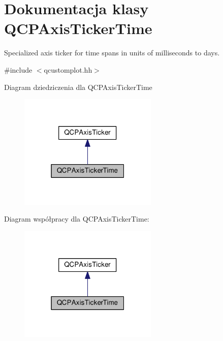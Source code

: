 \hypertarget{class_q_c_p_axis_ticker_time}{}\section{Dokumentacja klasy Q\+C\+P\+Axis\+Ticker\+Time}
\label{class_q_c_p_axis_ticker_time}


Specialized axis ticker for time spans in units of milliseconds to days.  




{\ttfamily \#include $<$qcustomplot.\+hh$>$}



Diagram dziedziczenia dla Q\+C\+P\+Axis\+Ticker\+Time\nopagebreak
\begin{figure}[H]
\begin{center}
\leavevmode
\includegraphics[width=187pt]{class_q_c_p_axis_ticker_time__inherit__graph}
\end{center}
\end{figure}


Diagram współpracy dla Q\+C\+P\+Axis\+Ticker\+Time\+:\nopagebreak
\begin{figure}[H]
\begin{center}
\leavevmode
\includegraphics[width=187pt]{class_q_c_p_axis_ticker_time__coll__graph}
\end{center}
\end{figure}
